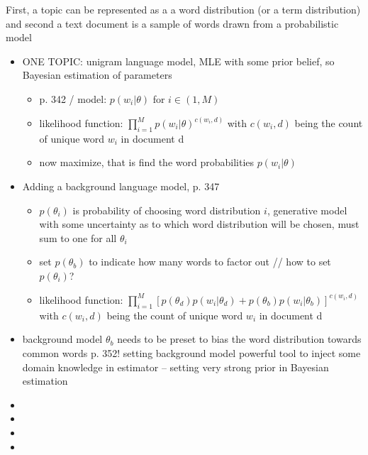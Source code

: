 \documentclass[11pt,a4paper,english,oneside]{book}
\numberwithin{equation}{chapter}
\begin{document}
First, a topic can be represented as a a word distribution (or a term distribution) and second a text document is a sample of words drawn from a probabilistic model 
\begin{itemize}
	\item ONE TOPIC: unigram language model, MLE with some prior belief, so Bayesian estimation of parameters
	\begin{itemize}
		\item p. 342 / model: $p(w_i | \theta)$ for $ i \in (1, M)$
		\item likelihood function: $\prod_{i = 1}^{M} p(w_i | \theta)^{c(w_i, d)}$ with $c(w_i, d)$ being the count of unique word $w_i$ in document d
		\item now maximize, that is find the word probabilities $p(w_i | \theta)$
	\end{itemize}
	\item Adding a background language model, p. 347
	\begin{itemize}
		\item $p(\theta_i)$ is probability of choosing word distribution $i$, generative model with some uncertainty as to which word distribution will be chosen, must sum to one for all $\theta_i$
		\item set $p(\theta_b)$ to indicate how many words to factor out // how to set $p(\theta_i)$?
		\item likelihood function: $\prod_{i = 1}^{M} [ p(\theta_d)p(w_i | \theta_d) + p(\theta_b)p(w_i | \theta_b) ]^{c(w_i, d)} $ with $c(w_i, d)$ being the count of unique word $w_i$ in document d
	\end{itemize}
	\item background model $\theta_b$ needs to be preset to bias the word distribution towards common words p. 352! setting background model powerful tool to inject some domain knowledge in estimator -- setting very strong prior in Bayesian estimation
	\item 
	\item 
	\item 
	\item 
\end{itemize}
\end{document}
